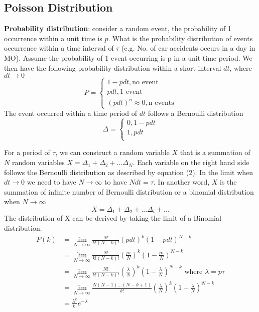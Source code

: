 \documentclass[12pt, oneside]{article}
\begin{document}
\subsection{Poisson Distribution}
\textbf{Probability distribution}: consider a random event, the probability of 1 occurrence within a unit time is $p$. What is the probability distribution of events occurrence within a time interval of $\tau$ (e.g. No. of car accidents occurs in a day in MO). 
Assume the probability of 1 event occurring is p in a unit time period. We then have the following probability distribution within a short interval $dt$, where $dt\rightarrow 0$
\begin{equation*}
P=
\begin{cases}
1-pdt, \text{no event}\\
pdt, \text{1 event}\\
(pdt)^n\approx 0, \text{n events}
\end{cases}
\end{equation*}
The event occurred within a time period of $dt$ follows a Bernoulli distribution
\begin{equation}
{\Delta}=
\begin{cases}
0, 1-pdt\\
1, pdt\\
\end{cases}
\end{equation}

For a period of $\tau$, we can construct a random variable $X$ that is a summation of $N$ random variables $X=\Delta_1+\Delta_2+...\Delta_N$. Each variable on the right hand side follows the Bernoulli distribution as described by equation (2). In the limit when $dt \rightarrow 0$ we need to have $N\rightarrow \infty$ to have $Ndt=\tau$. In another word, $X$ is the summation of infinite number of Bernoulli distribution or a binomial distribution when $N\rightarrow \infty$
$$X=\Delta_1+\Delta_2+...\Delta_i+...$$
The distribution of X can be derived by taking the limit of a Binomial distribution.
\begin{align*}
P(k)&=\lim_{N \rightarrow \infty}\frac{N!}{k!(N-k)!}(pdt)^k(1-pdt)^{N-k}\\
&=\lim_{N \rightarrow \infty}\frac{N!}{k!(N-k)!}(\frac{p\tau}{N})^k(1-\frac{p\tau}{N})^{N-k}\\
&=\lim_{N \rightarrow \infty}\frac{N!}{k!(N-k)!}(\frac{\lambda}{N})^k(1-\frac{\lambda}{N})^{N-k} \text{ where } \lambda=p\tau\\
&=\lim_{N \rightarrow \infty}\frac{N(N-1)...(N-k+1)}{k!}(\frac{\lambda}{N})^k(1-\frac{\lambda}{N})^{N-k}\\
&=\frac{\lambda^k}{k!}e^{-\lambda}
\end{align*}
\end{document}

